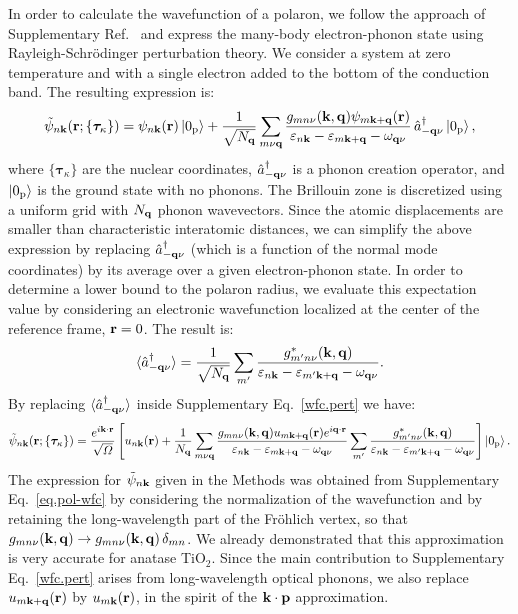 \documentclass[12pt]{nature-mod}
\def\bk{{\bf k}}
\def\bq{{\bf q}}
\def\ve{\varepsilon}
\begin{document}
In order to calculate the wavefunction of a polaron, we follow the approach of Supplementary 
Ref.~ and express the many-body electron-phonon state using Rayleigh-Schr\"odinger 
perturbation theory. We consider a system at zero temperature and with a single electron added to the 
bottom of the conduction band. The resulting expression is:
  \begin{equation} \label{wfc.pert}
  \tilde{\psi}_{n\bk}({\bf r};\{ {\bm\tau}_{\kappa} \})=
  \psi_{n\bk}({\bf r})\ket{0_{\rm p}} + \frac{1}{\sqrt{N_\bq}}\sum_{m\nu\bq} \frac{
  g_{mn\nu}(\bk,\bq) \psi_{m\bk+\bq}({\bf r})} {\ve_{n\bk}-\ve_{m\bk+\bq}-\omega_{\bq\nu}}
  \,\hat a^\dagger_{-\bq\nu}\ket{0_{\rm p}},
  \end{equation}
where $\{ {\bm\tau}_{\kappa} \}$ are the nuclear coordinates, 
$\hat a^\dagger_{-\bq\nu}$ is a phonon creation operator, and $\ket{0_{\rm p}}$ is the ground 
state with no phonons. The Brillouin zone is discretized using a uniform grid with $N_{\bq}$ phonon
wavevectors. Since the atomic displacements are smaller than characteristic interatomic distances, 
we can simplify the above expression by replacing $\hat a^\dagger_{-\bq\nu}$ (which is a function 
of the normal mode coordinates) by its average over a given electron-phonon state\cite{Mahan}. 
In order to determine a lower bound to the polaron radius, we evaluate this expectation value by 
considering an electronic wavefunction localized at the center of the reference frame, ${\bf r}=0$. 
The result is:
  \begin{equation}
  \langle\hat a_{-\bq\nu}^\dagger\rangle= \frac{1}{\sqrt{N_\bq}}\sum_{m'} 
  \frac{ g^\ast_{m'n\nu}(\bk,\bq) } {\ve_{n\bk}-\ve_{m'\bk+\bq}-\omega_{\bq\nu}}.
  \end{equation}
By replacing $\langle\hat a_{-\bq\nu}^\dagger\rangle$ inside Supplementary Eq.~\eqref{wfc.pert} 
we have:
  \begin{equation}\label{eq.pol-wfc}
  \tilde{\psi}_{n\bk}({\bf r};\{ {\bm\tau}_{\kappa} \})= \frac{e^{i\bk\cdot{\bf r}}}{\sqrt{\varOmega}} 
  \left[ u_{n\bk}({\bf r}) + \frac{1}{N_\bq}\sum_{m\nu\bq} \frac{
  g_{mn\nu}(\bk,\bq) u_{m\bk+\bq}({\bf r})e^{i\bq\cdot{\bf r}} } {\ve_{n\bk}-\ve_{m\bk+\bq}-\omega_{\bq\nu}} 
  \sum_{m'} \frac{g^\ast_{m'n\nu}(\bk,\bq)} {\ve_{n\bk}-\ve_{m'\bk+\bq}-\omega_{\bq\nu}} \right] 
  \ket{0_{\rm p}} .
  \end{equation}
The expression for $\tilde{\psi}_{n\bk}$ given in the Methods was obtained from Supplementary 
Eq.~\eqref{eq.pol-wfc} by considering the normalization of the wavefunction and by retaining the long-wavelength 
part of the Fr\"ohlich vertex, so that $g_{mn\nu}(\bk,\bq)\rightarrow g_{mn\nu}(\bk,\bq)\,\delta_{mn}$. 
We already demonstrated that this approximation is very accurate for anatase TiO$_2$\cite{Verdi2015}. Since 
the main contribution to Supplementary Eq.~\eqref{wfc.pert} arises from 
long-wavelength optical phonons, we also replace $u_{m\bk+\bq}(\mathbf r)$ by $u_{m\bk}(\mathbf r)$,
in the spirit of the $\bk \cdot {\bf p}$ approximation.
\end{document}
